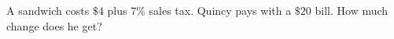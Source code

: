 A sandwich costs $\$4$ plus $7\%$ sales tax. Quincy pays with a $\$20$ bill. How much change does he get?
